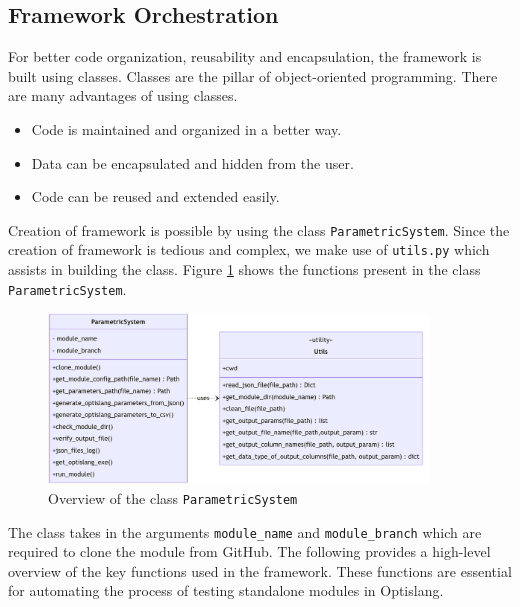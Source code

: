 \subsection{Framework Orchestration}
For better code organization, reusability and encapsulation, the framework is built using classes. Classes are the pillar of object-oriented programming.
There are many advantages of using classes.
\begin{itemize}
  \item Code is maintained and organized in a better way.
  \item Data can be encapsulated and hidden from the user.
  \item Code can be reused and extended easily.
\end{itemize}
Creation of framework is possible by using the class \texttt{ParametricSystem}. Since the creation of framework is tedious and complex, we make use of 
\texttt{utils.py} which assists in building the class. Figure \ref{parametric_system_class} shows the functions present in the class \texttt{ParametricSystem}.
\begin{figure}[!ht]
  \centering
  \includegraphics[width=0.9\textwidth]{Images/parametric_system_class.pdf}
  \caption{Overview of the class \texttt{ParametricSystem}}
  \label{parametric_system_class}
\end{figure}

The class takes in the arguments \texttt{module\_name} and \texttt{module\_branch} which are required to clone the module from GitHub. 
The following provides a high-level overview of the key functions used in the framework. These functions are essential for automating the process of testing 
standalone modules in Optislang.

